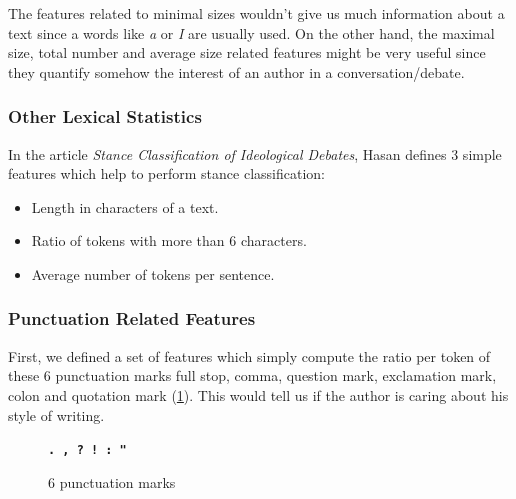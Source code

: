 The features related to minimal sizes wouldn't give us much information about a text since a words like \emph{a} or \emph{I} are usually used. On the other hand, the maximal size, total number and average size related features might be very useful since they quantify somehow the interest of an author in a conversation/debate.

\subsubsection{Other Lexical Statistics}
In the article \emph{Stance Classification of Ideological Debates}\cite{Hasan-Ng:IJCNLP:2013}, Hasan defines 3 simple features which help to perform stance classification:
\
\begin{itemize}
  \item Length in characters of a text.
  \item Ratio of tokens with more than 6 characters.
  \item Average number of tokens per sentence.
\end{itemize}  

\subsubsection{Punctuation Related Features}
First, we defined a set of features which simply compute the ratio per token of these 6 punctuation marks full stop, comma, question mark, exclamation mark, colon and quotation mark (\cref{punctuation}). This would tell us if the author is caring about his style of writing.
\\
\begin{figure}[h]
\begin{center}
\texttt{\textbf{.  ,  ?  !  :  "}}
\caption{\label{punctuation} 6 punctuation marks}
\end{center}
\end{figure}

